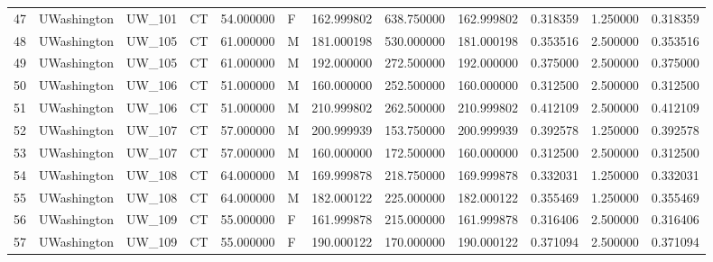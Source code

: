 \begin{tabular}{llllrlrrrrrr}
47     &     UWashington &       UW\_101 &                 CT &  54.000000 &        F &       162.999802 &    638.750000 &  162.999802 &               0.318359 &            1.250000 &          0.318359 \\
48     &     UWashington &       UW\_105 &                 CT &  61.000000 &        M &       181.000198 &    530.000000 &  181.000198 &               0.353516 &            2.500000 &          0.353516 \\
49     &     UWashington &       UW\_105 &                 CT &  61.000000 &        M &       192.000000 &    272.500000 &  192.000000 &               0.375000 &            2.500000 &          0.375000 \\
50     &     UWashington &       UW\_106 &                 CT &  51.000000 &        M &       160.000000 &    252.500000 &  160.000000 &               0.312500 &            2.500000 &          0.312500 \\
51     &     UWashington &       UW\_106 &                 CT &  51.000000 &        M &       210.999802 &    262.500000 &  210.999802 &               0.412109 &            2.500000 &          0.412109 \\
52     &     UWashington &       UW\_107 &                 CT &  57.000000 &        M &       200.999939 &    153.750000 &  200.999939 &               0.392578 &            1.250000 &          0.392578 \\
53     &     UWashington &       UW\_107 &                 CT &  57.000000 &        M &       160.000000 &    172.500000 &  160.000000 &               0.312500 &            2.500000 &          0.312500 \\
54     &     UWashington &       UW\_108 &                 CT &  64.000000 &        M &       169.999878 &    218.750000 &  169.999878 &               0.332031 &            1.250000 &          0.332031 \\
55     &     UWashington &       UW\_108 &                 CT &  64.000000 &        M &       182.000122 &    225.000000 &  182.000122 &               0.355469 &            1.250000 &          0.355469 \\
56     &     UWashington &       UW\_109 &                 CT &  55.000000 &        F &       161.999878 &    215.000000 &  161.999878 &               0.316406 &            2.500000 &          0.316406 \\
57     &     UWashington &       UW\_109 &                 CT &  55.000000 &        F &       190.000122 &    170.000000 &  190.000122 &               0.371094 &            2.500000 &          0.371094 \\

\end{tabular}
